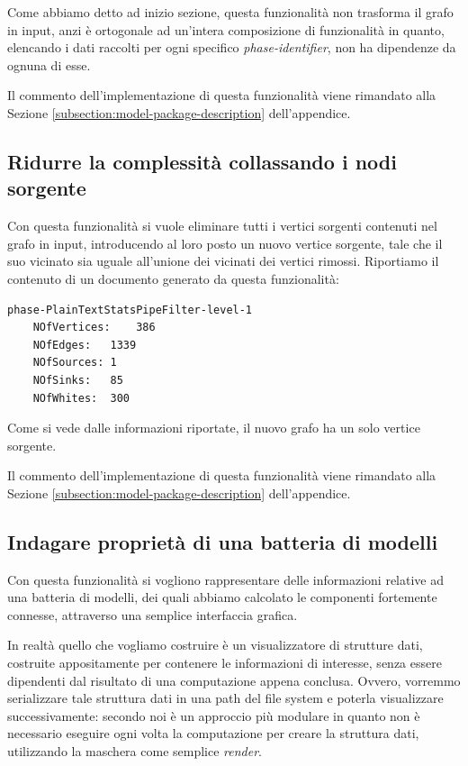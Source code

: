 Come abbiamo detto ad inizio sezione, questa funzionalit\`a non
trasforma il grafo in input, anzi \`e ortogonale ad un'intera
composizione di funzionalit\`a in quanto, elencando i dati raccolti
per ogni specifico \emph{phase-identifier}, non ha dipendenze da
ognuna di esse.

Il commento dell'implementazione di questa funzionalit\`a viene
rimandato alla Sezione \ref{subsection:model-package-description}
dell'appendice.

\subsection{Ridurre la complessit\`a collassando i nodi sorgente}
\label{subsection:collapse-sources-use-case}
Con questa funzionalit\`a si vuole eliminare tutti i vertici sorgenti
contenuti nel grafo in input, introducendo al loro posto un nuovo
vertice sorgente, tale che il suo vicinato sia uguale all'unione dei
vicinati dei vertici rimossi. Riportiamo il contenuto di un documento
generato da questa funzionalit\`a:
\begin{lstlisting}
phase-PlainTextStatsPipeFilter-level-1
	NOfVertices:	386
	NOfEdges:	1339
	NOfSources:	1
	NOfSinks:	85
	NOfWhites:	300
\end{lstlisting}
Come si vede dalle informazioni riportate, il nuovo grafo ha un solo
vertice sorgente.

Il commento dell'implementazione di questa funzionalit\`a viene
rimandato alla Sezione \ref{subsection:model-package-description}
dell'appendice.


\subsection{Indagare propriet\`a di una batteria di modelli}
\label{subsection:use-case-result-viewer}
Con questa funzionalit\`a si vogliono rappresentare delle informazioni
relative ad una batteria di modelli, dei quali abbiamo calcolato le
componenti fortemente connesse, attraverso una semplice interfaccia
grafica.

In realt\`a quello che vogliamo costruire \`e un visualizzatore di
strutture dati, costruite appositamente per contenere le informazioni
di interesse, senza essere dipendenti dal risultato di una
computazione appena conclusa. Ovvero, vorremmo serializzare tale
struttura dati in una path del file system e poterla visualizzare
successivamente: secondo noi \`e un approccio pi\`u modulare in quanto
non \`e necessario eseguire ogni volta la computazione per creare la
struttura dati, utilizzando la maschera come semplice \emph{render}.

